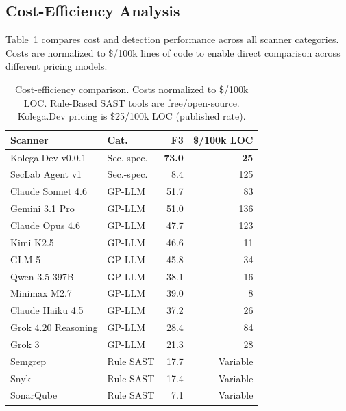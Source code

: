 \subsection{Cost-Efficiency Analysis}
\label{sec:results:cost}

Table~\ref{tab:cost-efficiency} compares cost and detection performance across all scanner categories. Costs are normalized to \$/100k lines of code to enable direct comparison across different pricing models.

\begin{table}[t]
\centering
\caption{Cost-efficiency comparison. Costs normalized to \$/100k LOC. Rule-Based SAST tools are free/open-source. Kolega.Dev pricing is \$25/100k LOC (published rate).}
\label{tab:cost-efficiency}
\footnotesize
\begin{tabular}{@{}llrr@{}}
\toprule
\textbf{Scanner} & \textbf{Cat.} & \textbf{F3} & \textbf{\$/100k LOC} \\
\midrule
Kolega.Dev v0.0.1    & Sec.-spec.  & \textbf{73.0} & \textbf{25} \\
SecLab Agent v1      & Sec.-spec.  & 8.4            & 125 \\
\midrule
Claude Sonnet 4.6    & GP-LLM      & 51.7 & 83 \\
Gemini 3.1 Pro       & GP-LLM      & 51.0 & 136 \\
Claude Opus 4.6      & GP-LLM      & 47.7 & 123 \\
Kimi K2.5            & GP-LLM      & 46.6 & 11 \\
GLM-5                & GP-LLM      & 45.8 & 34 \\
Qwen 3.5 397B        & GP-LLM      & 38.1 & 16 \\
Minimax M2.7         & GP-LLM      & 39.0 & 8 \\
Claude Haiku 4.5     & GP-LLM      & 37.2 & 26 \\
Grok 4.20 Reasoning  & GP-LLM      & 28.4 & 84 \\
Grok 3               & GP-LLM      & 21.3 & 28 \\
\midrule
Semgrep              & Rule SAST   & 17.7 & Variable \\
Snyk                 & Rule SAST   & 17.4 & Variable \\
SonarQube            & Rule SAST   & 7.1  & Variable \\
\bottomrule
\end{tabular}
\end{table}

